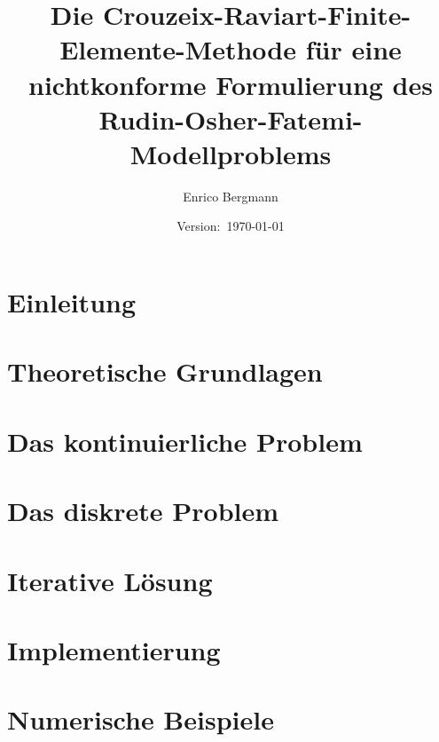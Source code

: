 \documentclass[draft=false,twoside,11pt]{scrreprt}
\title{Die Crouzeix\--Raviart\--Finite\--Elemente\--Methode für
eine nichtkonforme Formulierung des Rudin\--Osher\--Fatemi\--Modellproblems}
\author{Enrico Bergmann}
\date{Version:~\today}
\begin{document}


\tableofcontents

%

\newpage


\chapter{Einleitung}
\label{chap:introduction}


\chapter{Theoretische Grundlagen}
\label{chap:theoreticalBasics}


\chapter{Das kontinuierliche Problem}
\label{chap:continuousProblem}


\chapter{Das diskrete Problem}
\label{chap:discreteProblem}


\chapter{Iterative Lösung}
\label{chap:algorithm}


\chapter{Implementierung}
\label{chap:implementation}


\chapter{Numerische Beispiele}
\label{chap:experiments}


%
%
\end{document}

